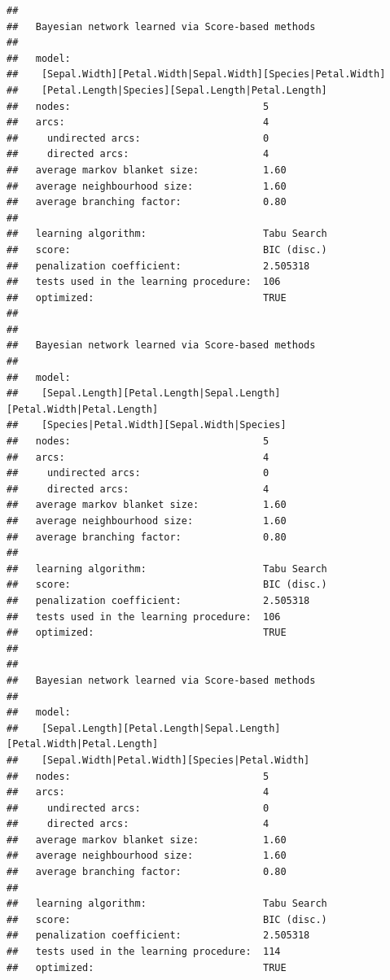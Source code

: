 \documentclass[]{article}
\begin{document}
\begin{verbatim}
## 
##   Bayesian network learned via Score-based methods
## 
##   model:
##    [Sepal.Width][Petal.Width|Sepal.Width][Species|Petal.Width]
##    [Petal.Length|Species][Sepal.Length|Petal.Length]
##   nodes:                                 5 
##   arcs:                                  4 
##     undirected arcs:                     0 
##     directed arcs:                       4 
##   average markov blanket size:           1.60 
##   average neighbourhood size:            1.60 
##   average branching factor:              0.80 
## 
##   learning algorithm:                    Tabu Search 
##   score:                                 BIC (disc.) 
##   penalization coefficient:              2.505318 
##   tests used in the learning procedure:  106 
##   optimized:                             TRUE 
## 
## 
##   Bayesian network learned via Score-based methods
## 
##   model:
##    [Sepal.Length][Petal.Length|Sepal.Length][Petal.Width|Petal.Length]
##    [Species|Petal.Width][Sepal.Width|Species]
##   nodes:                                 5 
##   arcs:                                  4 
##     undirected arcs:                     0 
##     directed arcs:                       4 
##   average markov blanket size:           1.60 
##   average neighbourhood size:            1.60 
##   average branching factor:              0.80 
## 
##   learning algorithm:                    Tabu Search 
##   score:                                 BIC (disc.) 
##   penalization coefficient:              2.505318 
##   tests used in the learning procedure:  106 
##   optimized:                             TRUE 
## 
## 
##   Bayesian network learned via Score-based methods
## 
##   model:
##    [Sepal.Length][Petal.Length|Sepal.Length][Petal.Width|Petal.Length]
##    [Sepal.Width|Petal.Width][Species|Petal.Width]
##   nodes:                                 5 
##   arcs:                                  4 
##     undirected arcs:                     0 
##     directed arcs:                       4 
##   average markov blanket size:           1.60 
##   average neighbourhood size:            1.60 
##   average branching factor:              0.80 
## 
##   learning algorithm:                    Tabu Search 
##   score:                                 BIC (disc.) 
##   penalization coefficient:              2.505318 
##   tests used in the learning procedure:  114 
##   optimized:                             TRUE
\end{verbatim}
\end{document}

